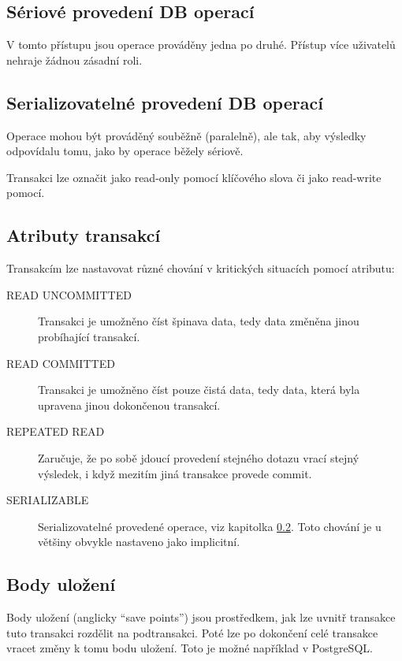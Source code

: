 \subsection{Sériové provedení DB operací}
V tomto přístupu jsou operace prováděny jedna po druhé. Přístup více uživatelů nehraje žádnou zásadní roli.

\subsection{Serializovatelné provedení DB operací}\label{sec:ser}
Operace mohou být prováděný souběžně (paralelně), ale tak, aby výsledky odpovídalu tomu, jako by operace běžely sériově.

Transakci lze označit jako read-only pomocí klíčového slova či jako read-write pomocí.

\subsection{Atributy transakcí}
Transakcím lze nastavovat různé chování v kritických situacích pomocí atributu:
\begin{description}
\item[READ UNCOMMITTED] Transakci je umožněno číst špinava data, tedy data změněna jinou probíhající transakcí.
\item[READ COMMITTED] Transakci je umožněno číst pouze čistá data, tedy data, která byla upravena jinou dokončenou transakcí.
\item[REPEATED READ] Zaručuje, že po sobě jdoucí provedení stejného dotazu vrací stejný výsledek, i když mezitím jiná transakce provede commit.
\item[SERIALIZABLE] Serializovatelné provedené operace, viz kapitolka \ref{sec:ser}. Toto chování je u většiny  obvykle nastaveno jako implicitní.
\end{description}

\subsection{Body uložení}
Body uložení (anglicky \enquote{save points}) jsou prostředkem, jak lze uvnitř transakce tuto transakci rozdělit na podtransakci. Poté lze po dokončení celé transakce vracet změny k tomu bodu uložení. Toto je možné například v PostgreSQL.


